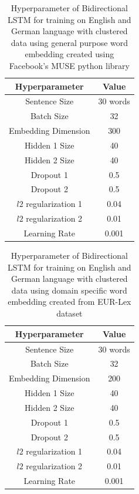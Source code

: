 \begin{table}[!ht]
\centering
\begin{tabular}{cc}
\hline
\textbf{Hyperparameter} & \textbf{Value} \\ \hline
Sentence Size & 30 words \\
Batch Size & 32 \\
Embedding Dimension & 300 \\
Hidden 1 Size & 40 \\
Hidden 2 Size & 40 \\
Dropout 1 & 0.5 \\
Dropout 2 & 0.5 \\
$l2$ regularization 1 & 0.04 \\
$l2$ regularization 2 & 0.01 \\
Learning Rate & 0.001 \\ \hline
\end{tabular}
\captionsetup{justification=centering,margin=2cm}
\caption{Hyperparameter of Bidirectional LSTM for training on English and German language with clustered data using general purpose word embedding created using Facebook's MUSE python library}
\label{table:FBMuseGeneralpurpose}
\end{table}

\begin{table}[!ht]
\centering
\begin{tabular}{cc}
\hline
\textbf{Hyperparameter} & \textbf{Value} \\ \hline
Sentence Size & 30 words \\
Batch Size & 32 \\
Embedding Dimension & 200 \\
Hidden 1 Size & 40 \\
Hidden 2 Size & 40 \\
Dropout 1 & 0.5 \\
Dropout 2 & 0.5 \\
$l2$ regularization 1 & 0.04 \\
$l2$ regularization 2 & 0.01 \\
Learning Rate & 0.001 \\ \hline
\end{tabular}
\captionsetup{justification=centering,margin=2cm}
\caption{Hyperparameter of Bidirectional LSTM for training on English and German language with clustered data using domain specific word embedding created from EUR-Lex dataset}
\label{table:DomainSpecificHyperparameter}
\end{table}

